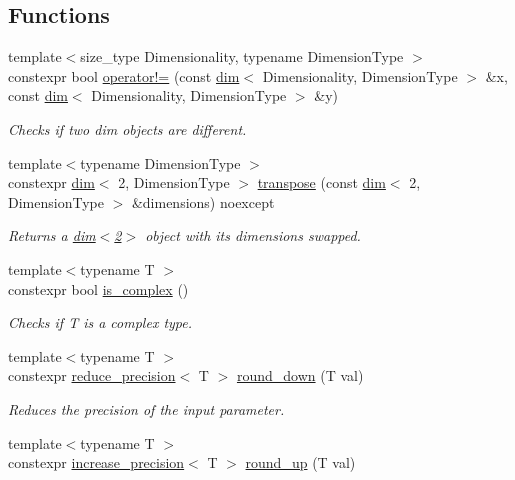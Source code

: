\subsection*{Functions}
\begin{DoxyCompactItemize}
\item 
{\footnotesize template$<$size\+\_\+type Dimensionality, typename Dimension\+Type $>$ }\\constexpr bool \hyperlink{namespacegko_a74c3716da36cbedc000aa24006b0bd46}{operator!=} (const \hyperlink{structgko_1_1dim}{dim}$<$ Dimensionality, Dimension\+Type $>$ \&x, const \hyperlink{structgko_1_1dim}{dim}$<$ Dimensionality, Dimension\+Type $>$ \&y)
\begin{DoxyCompactList}\small\item\em Checks if two dim objects are different. \end{DoxyCompactList}\item 
{\footnotesize template$<$typename Dimension\+Type $>$ }\\constexpr \hyperlink{structgko_1_1dim}{dim}$<$ 2, Dimension\+Type $>$ \hyperlink{namespacegko_a9b6a9d7018703d6d1f2140054e2afe4a}{transpose} (const \hyperlink{structgko_1_1dim}{dim}$<$ 2, Dimension\+Type $>$ \&dimensions) noexcept
\begin{DoxyCompactList}\small\item\em Returns a \hyperlink{structgko_1_1dim}{dim$<$2$>$} object with its dimensions swapped. \end{DoxyCompactList}\item 
{\footnotesize template$<$typename T $>$ }\\constexpr bool \hyperlink{namespacegko_a9b3e79911bb6145d7ba865dbe436b915}{is\+\_\+complex} ()
\begin{DoxyCompactList}\small\item\em Checks if T is a complex type. \end{DoxyCompactList}\item 
{\footnotesize template$<$typename T $>$ }\\constexpr \hyperlink{namespacegko_ab5d71c1f4bd1b654df1e561ea7a811f2}{reduce\+\_\+precision}$<$ T $>$ \hyperlink{namespacegko_a5f9c197f1db98fdc874f8907978ad114}{round\+\_\+down} (T val)
\begin{DoxyCompactList}\small\item\em Reduces the precision of the input parameter. \end{DoxyCompactList}\item 
{\footnotesize template$<$typename T $>$ }\\constexpr \hyperlink{namespacegko_a373c2b4782d95e675d7e91a75bab101d}{increase\+\_\+precision}$<$ T $>$ \hyperlink{namespacegko_ad45d1c855f31d2f8c1d3d799f2cf21c6}{round\+\_\+up} (T val)

\end{DoxyCompactItemize}
